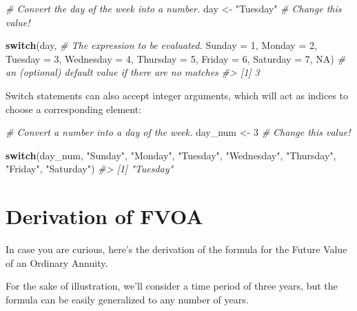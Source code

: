 \documentclass[
]{book}
\newenvironment{Shaded}{\begin{snugshade}}{\end{snugshade}}
\newcommand{\AttributeTok}[1]{\textcolor[rgb]{0.77,0.63,0.00}{#1}}
\newcommand{\CommentTok}[1]{\textcolor[rgb]{0.56,0.35,0.01}{\textit{#1}}}
\newcommand{\ConstantTok}[1]{\textcolor[rgb]{0.00,0.00,0.00}{#1}}
\newcommand{\ControlFlowTok}[1]{\textcolor[rgb]{0.13,0.29,0.53}{\textbf{#1}}}
\newcommand{\DecValTok}[1]{\textcolor[rgb]{0.00,0.00,0.81}{#1}}
\newcommand{\NormalTok}[1]{#1}
\newcommand{\OtherTok}[1]{\textcolor[rgb]{0.56,0.35,0.01}{#1}}
\newcommand{\StringTok}[1]{\textcolor[rgb]{0.31,0.60,0.02}{#1}}
\begin{document}
\begin{Shaded}
\begin{Highlighting}[]
\CommentTok{\# Convert the day of the week into a number.}
\NormalTok{day }\OtherTok{\textless{}{-}} \StringTok{"Tuesday"} \CommentTok{\# Change this value!}

\ControlFlowTok{switch}\NormalTok{(day, }\CommentTok{\# The expression to be evaluated.}
  \AttributeTok{Sunday =} \DecValTok{1}\NormalTok{,}
  \AttributeTok{Monday =} \DecValTok{2}\NormalTok{,}
  \AttributeTok{Tuesday =} \DecValTok{3}\NormalTok{,}
  \AttributeTok{Wednesday =} \DecValTok{4}\NormalTok{,}
  \AttributeTok{Thursday =} \DecValTok{5}\NormalTok{,}
  \AttributeTok{Friday =} \DecValTok{6}\NormalTok{,}
  \AttributeTok{Saturday =} \DecValTok{7}\NormalTok{,}
  \ConstantTok{NA}\NormalTok{) }\CommentTok{\# an (optional) default value if there are no matches}
\CommentTok{\#\textgreater{} [1] 3}
\end{Highlighting}
\end{Shaded}

Switch statements can also accept integer arguments, which will act as indices
to choose a corresponding element:

\begin{Shaded}
\begin{Highlighting}[]
\CommentTok{\# Convert a number into a day of the week.}
\NormalTok{day\_num }\OtherTok{\textless{}{-}} \DecValTok{3} \CommentTok{\# Change this value!}

\ControlFlowTok{switch}\NormalTok{(day\_num,}
  \StringTok{"Sunday"}\NormalTok{,}
  \StringTok{"Monday"}\NormalTok{,}
  \StringTok{"Tuesday"}\NormalTok{,}
  \StringTok{"Wednesday"}\NormalTok{,}
  \StringTok{"Thursday"}\NormalTok{,}
  \StringTok{"Friday"}\NormalTok{,}
  \StringTok{"Saturday"}\NormalTok{)}
\CommentTok{\#\textgreater{} [1] "Tuesday"}
\end{Highlighting}
\end{Shaded}

\hypertarget{derivation-of-fvoa}{%
\section{Derivation of FVOA}\label{derivation-of-fvoa}}

In case you are curious, here's the derivation of the formula for the
Future Value of an Ordinary Annuity.

For the sake of illustration, we'll consider a time period of three years,
but the formula can be easily generalized to any number of years.
\end{document}
